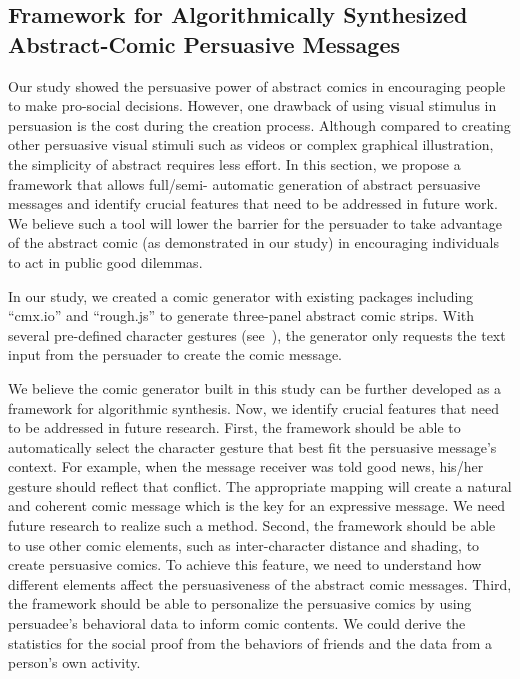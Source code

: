 
 \subsection{Framework for Algorithmically Synthesized Abstract-Comic Persuasive Messages}
 \label{sub:framework}
 
Our study showed the persuasive power of abstract comics in encouraging people to make pro-social decisions. However, one drawback of using visual stimulus in persuasion is the cost during the creation process. Although compared to creating other persuasive visual stimuli such as videos or complex graphical illustration, the simplicity of abstract requires less effort. In this section, we propose a framework that allows full/semi- automatic generation of abstract persuasive messages and identify crucial features that need to be addressed in future work. We believe such a tool will lower the barrier for the persuader to take advantage of the abstract comic (as demonstrated in our study) in encouraging individuals to act in public good dilemmas.

In our study, we created a comic generator with existing packages including ``cmx.io'' \cite{cmx.io} and ``rough.js'' \cite{rough.js} to generate three-panel abstract comic strips. With several pre-defined character gestures (see~), the generator only requests the text input from the persuader to create the comic message.  

We believe the comic generator built in this study can be further developed as a framework for algorithmic synthesis. Now, we identify crucial features that need to be addressed in future research. First, the framework should be able to automatically select the character gesture that best fit the persuasive message's context. For example, when the message receiver was told good news, his/her gesture should reflect that conflict. The appropriate mapping will create a natural and coherent comic message which is the key for an expressive message. We need future research to realize such a method. Second, the framework should be able to use other comic elements, such as inter-character distance and shading, to create persuasive comics. To achieve this feature, we need to understand how different elements affect the persuasiveness of the abstract comic messages. Third, the framework should be able to personalize the persuasive comics by using persuadee's behavioral data to inform comic contents. We could derive the statistics for the social proof from the behaviors of friends and the data from a person's own activity.


